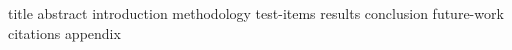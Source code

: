 \documentclass {journal}
\begin{document}
 {title}
 {abstract}
 {introduction}
 {methodology}
 {test-items}
 {results}
 {conclusion}
 {future-work}
 {citations}
 {appendix}
\end{document}
